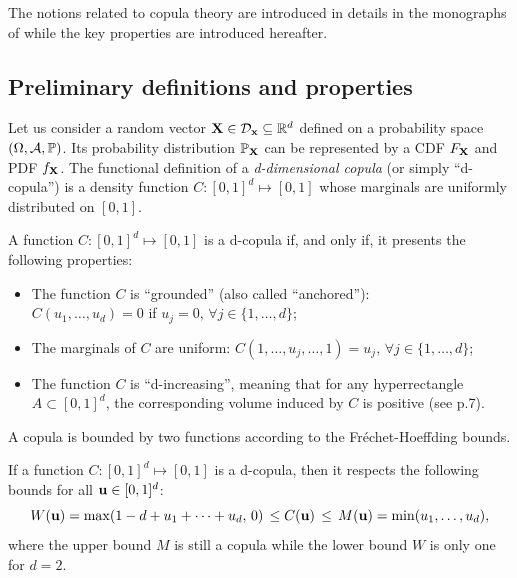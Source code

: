 The notions related to copula theory are introduced in details in the monographs of \citet{nelsen_2006_copulas,joe_2014,durante_2015_copula} while the key properties are introduced hereafter.


\subsection{Preliminary definitions and properties}\label{sec:copula_prelims}

Let us consider a random vector ${\bf X} \in \mathcal{D}_{{\bf x}}\subseteq\mathbb{R}^d$ defined on a probability space $(\Omega, \mathcal{A}, \mathbb{P})$. 
Its probability distribution $\mathbb{P}_{\bf X}$ can be represented by a CDF $F_{\bf X}$ and PDF $f_{\bf X}$. 
The functional definition of a \textit{d-dimensional copula} (or simply ``d-copula'') is a density function $C:[0, 1]^d \mapsto [0, 1]$ whose marginals are uniformly distributed on $[0, 1]$.
\begin{definition}[Copula]
    A function $C:[0, 1]^d \mapsto [0, 1]$ is a d-copula if, and only if, it presents the following properties:
    \begin{itemize}
        \item The function $C$ is ``grounded'' (also called ``anchored''): \\$C(u_1, \dots, u_d) = 0$ if $u_j=0, \, \forall j\in\{1, \dots, d\}$;
        \item The marginals of $C$ are uniform: $C(1, \dots, u_j, \dots, 1) = u_j,  \, \forall j\in\{1, \dots, d\}$;
        \item The function $C$ is ``d-increasing'', meaning that for any hyperrectangle $A \subset [0, 1]^d$, the corresponding volume induced by $C$ is positive (see \cite{durante_2015_copula} p.7). 
    \end{itemize}
\end{definition}
\medskip

A copula is bounded by two functions according to the Fréchet-Hoeffding bounds. 
\begin{theorem}
    If a function $C:[0, 1]^d \mapsto [0, 1]$ is a d-copula, then it respects the following bounds for all ${\bf u} \in [0, 1]^d$: 
    \begin{equation}
        W({\bf u}) = \max (1 - d + u_1 + \dots + u_d, \, 0) \, \leq C({\bf u}) \, \leq \, M({\bf u}) = \min(u_1,\dots ,u_d),
    \end{equation} 
    where the upper bound $M$ is still a copula while the lower bound $W$ is only one for $d=2$.
\end{theorem}


